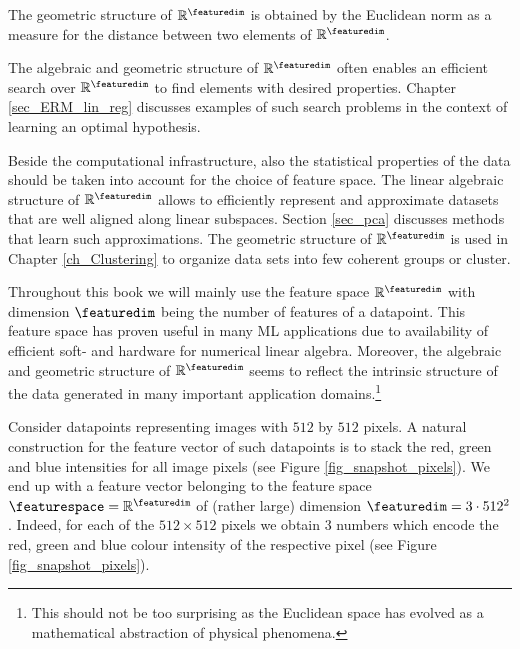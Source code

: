 \documentclass[12pt]{report}
\begin{document}
The geometric structure of $\mathbb{R}^{\featuredim}$ is obtained 
by the Euclidean norm as a measure for the distance between two 
elements of $\mathbb{R}^{\featuredim}$. 

The algebraic and geometric structure of  $\mathbb{R}^{\featuredim}$ 
often enables an efficient search over $\mathbb{R}^{\featuredim}$ to 
find elements with desired properties. Chapter \ref{sec_ERM_lin_reg} 
discusses examples of such search problems in the context of learning 
an optimal hypothesis. 

Beside the computational infrastructure, also the statistical properties 
of the data should be taken into account for the choice of feature space. 
The linear algebraic structure of $\mathbb{R}^{\featuredim}$ allows to 
efficiently represent and approximate datasets that are well aligned 
along linear subspaces. Section \ref{sec_pca} discusses methods that learn 
such approximations. The geometric structure of $\mathbb{R}^{\featuredim}$ 
is used in Chapter \ref{ch_Clustering} to organize data sets into few coherent groups 
or cluster. 

Throughout this book we will mainly use the feature space $\mathbb{R}^{\featuredim}$ 
with dimension $\featuredim$ being the number of features of a datapoint. This 
feature space has proven useful in many ML applications due to availability 
of efficient soft- and hardware for numerical linear algebra. Moreover, the 
algebraic and geometric structure of $\mathbb{R}^{\featuredim}$ seems to 
reflect the intrinsic structure of the data generated in many important 
application domains.\footnote{This should not be too surprising as the 
Euclidean space has evolved as a mathematical abstraction of physical phenomena.}



Consider datapoints representing images with $512$ by $512$ pixels. 
A natural construction for the feature vector of such datapoints is to 
stack the red, green and blue intensities for all image pixels (see Figure \ref{fig_snapshot_pixels}). 
We end up with a feature vector belonging to the feature space 
$\featurespace=\mathbb{R}^{\featuredim}$ of (rather large) dimension 
$\featuredim = 3 \cdot 512^2$. Indeed, for each of the $512 \times 512$ 
pixels we obtain $3$ numbers which encode the red, green and blue colour 
intensity of the respective pixel (see Figure \ref{fig_snapshot_pixels}). 
\end{document}
